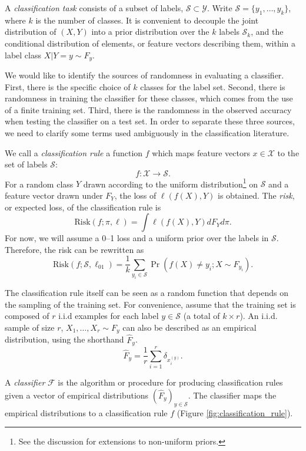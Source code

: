 A \emph{classification task} consists of a subset of labels,
$\mathcal{S} \subset \mathcal{Y}$. Write $\mathcal{S}=\{y_1,\hdots,
y_k\}$, where $k$ is the number of classes.  It is convenient to
decouple the joint distribution of $(X,Y)$ into a prior distribution
over the $k$ labels $\mathcal{S}_k$, and the conditional distribution
of elements, or feature vectors describing them, within a label class
$X|Y=y \sim F_y$.

We would like to identify the sources of randomness in evaluating a
classifier.  First, there is the specific choice of $k$ classes for
the label set. Second, there is randomness in training the classifier
for these classes, which comes from the use of a finite training
set. Third, there is the randomness in the observed accuracy when
testing the classifier on a test set. In order to separate these three
sources, we need to clarify some terms used ambiguously in the
classification literature.

We call a \emph{classification rule} a function $f$ which maps feature
vectors $x \in \mathcal{X}$ to the set of labels $\mathcal{S}$:
\[
f: \mathcal{X} \to \mathcal{S}.
\]
For a random class $Y$ drawn according to the uniform
distribution\footnote{See the discussion for extensions to non-uniform
priors.} on $\mathcal{S}$ and a feature vector drawn under $F_Y$, the
loss of $\ell(f(X),Y)$ is obtained.  The \emph{risk}, or expected
loss, of the classification rule is
\[\text{Risk}(f;\pi,\ell) = \int \ell(f(X),Y)dF_Y d\pi .\]
For now, we will assume a 0--1 loss and a uniform prior over the
labels in $\mathcal{S}$.  Therefore, the risk can be rewritten as
\[\text{Risk}(f;\mathcal{S}, \ell_{01}) = \frac{1}{k}\sum_{y_i\in \mathcal{S}}\Pr(f(X)\neq y_i ; X\sim F_{y_i} ).   \]

The classification rule itself can be seen as a random function that
depends on the sampling of the training set. For convenience, assume
that the training set is composed of $r$ i.i.d examples for
each label $y \in \mathcal{S}$ (a total of $k\times r$).  An
i.i.d. sample of size $r$, $X_1,\hdots, X_r \sim F_y$ can also be
described as an empirical distribution, using the shorthand
$\hat{F}_y$. 
\[\hat{F}_y = \frac{1}{r}\sum_{i=1}^r \delta_{x_i^{(y)}}.\]


A \emph{classifier} $\mathcal{F}$ is the algorithm or procedure for
producing classification rules given a vector of empirical
distributions $(\hat{F}_y)_{y\in \mathcal{S}}$.  The classifier maps
the empirical distributions to a classification rule $f$
(Figure \ref{fig:classification_rule}).

